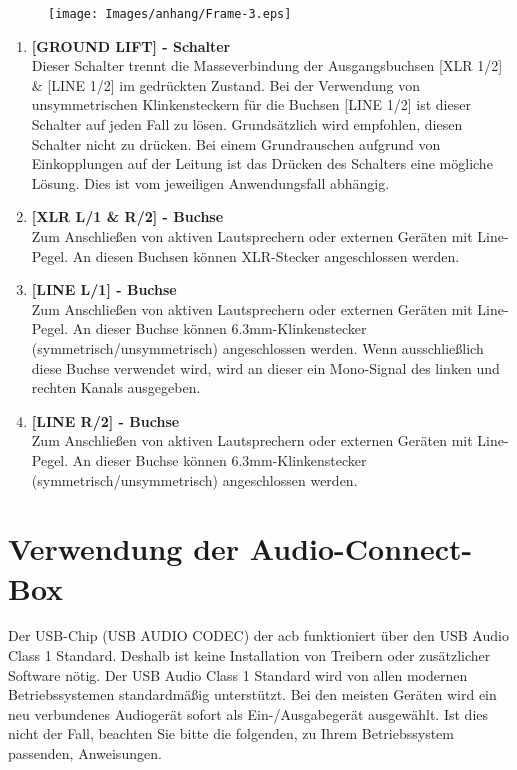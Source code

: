     \begin{figure}[H]
        \centering
        \texttt{[image: Images/anhang/Frame-3.eps]}
        \caption*{}
    \end{figure}
\begin{multicols}{2}
    \begin{enumerate}
        \item[\ding{202}] \textbf{[GROUND LIFT] - Schalter}    \\
            Dieser Schalter trennt die Masseverbindung der Ausgangsbuchsen [XLR 1/2] \& [LINE 1/2] im gedrückten Zustand.
            Bei der Verwendung von unsymmetrischen Klinkensteckern für die Buchsen [LINE 1/2] ist dieser Schalter auf jeden Fall zu lösen.
            Grundsätzlich wird empfohlen, diesen Schalter nicht zu drücken. Bei einem Grundrauschen aufgrund von Einkopplungen auf der Leitung ist das Drücken des Schalters eine mögliche Lösung. Dies ist vom jeweiligen Anwendungsfall abhängig.
        \item[\ding{203}] \textbf{[XLR L/1 \& R/2] - Buchse}    \\
            Zum Anschließen von aktiven Lautsprechern oder
            externen Geräten mit Line-Pegel. An diesen Buchsen
            können XLR-Stecker angeschlossen werden. 
        \item[\ding{204}] \textbf{[LINE L/1] - Buchse}    \\
            Zum Anschließen von aktiven Lautsprechern oder
            externen Geräten mit Line-Pegel. An dieser Buchse
            können 6.3mm-Klinkenstecker (symmetrisch/unsymmetrisch)
            angeschlossen werden. 
            Wenn ausschließlich diese Buchse verwendet wird, wird an dieser ein Mono-Signal des linken und rechten Kanals ausgegeben.
        \item[\ding{205}] \textbf{[LINE R/2] - Buchse}    \\
            Zum Anschließen von aktiven Lautsprechern oder
            externen Geräten mit Line-Pegel. An dieser Buchse
            können 6.3mm-Klinkenstecker (symmetrisch/unsymmetrisch)
            angeschlossen werden.
    \end{enumerate}
\end{multicols}

\pagebreak

\section{Verwendung der Audio-Connect-Box}
\label{sec:anleitung-verwendung}
Der USB-Chip (USB AUDIO CODEC) der \ac{acb} funktioniert über den USB Audio Class 1 Standard.
Deshalb ist keine Installation von Treibern oder zusätzlicher Software nötig. Der USB Audio Class 1 Standard wird von allen modernen Betriebssystemen standardmäßig unterstützt. Bei den meisten Geräten wird ein neu verbundenes Audiogerät sofort als Ein-/Ausgabegerät ausgewählt. Ist dies nicht der Fall, beachten Sie bitte die folgenden, zu Ihrem Betriebssystem passenden, Anweisungen.
